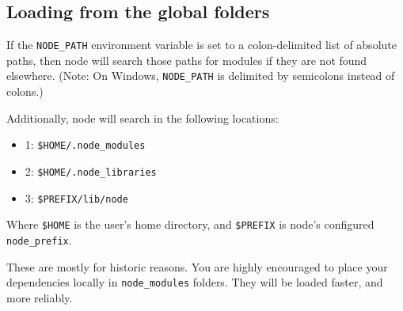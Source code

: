 \begin{Shaded}
\begin{Highlighting}[]
  
  
  \NormalTok{= []}
  \NormalTok{>= }\NormalTok{,}
    \NormalTok{[I] = } 
    \NormalTok{(PARTS[} \NormalTok{] + }\NormalTok{)}
    
     
 
\end{Highlighting}
\end{Shaded}

\subsection{Loading from the global
folders}\label{loading-from-the-global-folders}

If the \texttt{NODE\_PATH} environment variable is set to a
colon-delimited list of absolute paths, then node will search those
paths for modules if they are not found elsewhere. (Note: On Windows,
\texttt{NODE\_PATH} is delimited by semicolons instead of colons.)

Additionally, node will search in the following locations:

\begin{itemize}
\itemsep1pt\parskip0pt
\item
  1: \texttt{\$HOME/.node\_modules}
\item
  2: \texttt{\$HOME/.node\_libraries}
\item
  3: \texttt{\$PREFIX/lib/node}
\end{itemize}

Where \texttt{\$HOME} is the user's home directory, and
\texttt{\$PREFIX} is node's configured \texttt{node\_prefix}.

These are mostly for historic reasons. You are highly encouraged to
place your dependencies locally in \texttt{node\_modules} folders. They
will be loaded faster, and more reliably.

